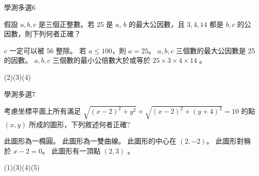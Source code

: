     \begin{QUESTION}
        \begin{ExamInfo}{95}{學測}{多選}{6}
        \end{ExamInfo}
        \begin{ExamAnsRateInfo}{15}{27}{8}{10}
        \end{ExamAnsRateInfo}
        \begin{QBODY}
            假設 $a, b, c$ 是三個正整數。若 25 是 $a$, $b$ 的最大公因數，且 $3,4,14$ 都是 $b,c$ 的公因數，則下列何者正確？
				\begin{QOPS} 
					\QOP $c$ 一定可以被 56 整除。 
					\QOP 若 $a \leq 100$，則 $a=25$。 
					\QOP $a, b, c$ 三個數的最大公因數是 25	的因數。
					\QOP $a,b,c$ 三個數的最小公倍數大於或等於 $25 \times 3 \times 4 \times 14$ 。
				\end{QOPS}
        \end{QBODY}
        \begin{QFROMS}
        \end{QFROMS}
        \begin{QTAGS}\end{QTAGS}
        \begin{QANS}
            (2)(3)(4)
        \end{QANS}
        \begin{QSOLLIST}
        \end{QSOLLIST}
        \begin{QEMPTYSPACE}
        \end{QEMPTYSPACE}
    \end{QUESTION}
    \begin{QUESTION}
        \begin{ExamInfo}{95}{學測}{多選}{7}
        \end{ExamInfo}
        \begin{ExamAnsRateInfo}{47}{83}{44}{14}
        \end{ExamAnsRateInfo}
        \begin{QBODY}
            考慮坐標平面上所有滿足 $\sqrt{(x-2)^2 +y^2} + \sqrt{(x-2)^2 +(y+4)^2} =10$ 的點 $(x,y)$ 所成的圖形，下列敘述何者正確? 
			\begin{QOPS} 
				\QOP 此圖形為一橢圓。
				\QOP 此圖形為一雙曲線。 
				\QOP 此圖形的中心在 $(2,-2)$。
				\QOP 此圖形對稱於 $x-2=0$。    
				\QOP 此圖形有一頂點 $(2, 3)$ 。
			\end{QOPS}
        \end{QBODY}
        \begin{QFROMS}
        \end{QFROMS}
        \begin{QTAGS}\end{QTAGS}
        \begin{QANS}
            (1)(3)(4)(5)
        \end{QANS}
        \begin{QSOLLIST}
        \end{QSOLLIST}
        \begin{QEMPTYSPACE}
        \end{QEMPTYSPACE}
    \end{QUESTION}
